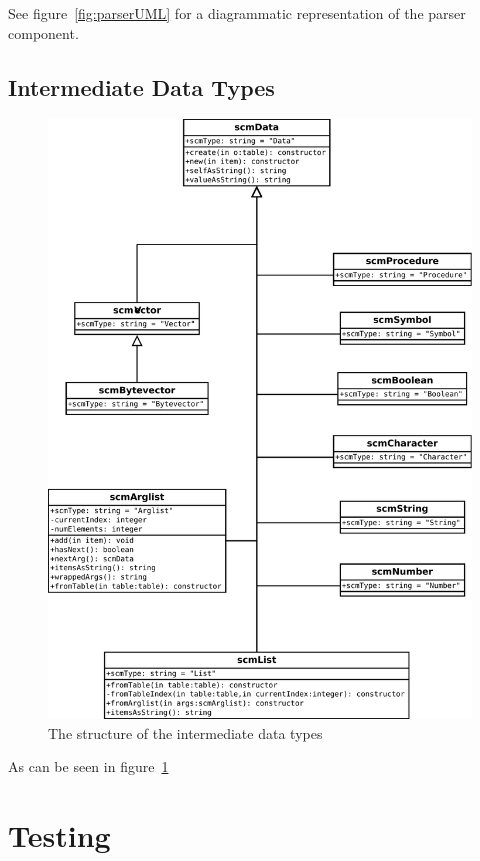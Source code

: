 See figure~\ref{fig:parserUML} for a diagrammatic representation of the parser
component.

\subsection{Intermediate Data Types}

\begin{figure}
\centering
\includegraphics[width=\textwidth]{scmDataUML.pdf}
\caption{The structure of the intermediate data types}
\label{fig:scmDataUML}
\end{figure}

As can be seen in figure~\ref{fig:scmDataUML}


\section{Testing}

